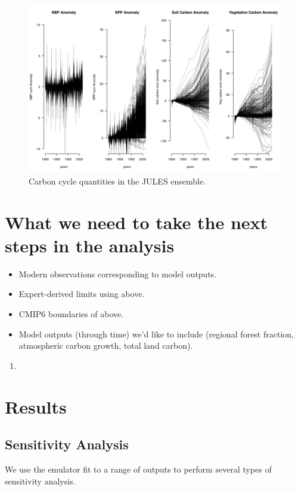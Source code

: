 \documentclass[gmd, manuscript]{copernicus}
\begin{document}
%
\begin{figure}[t]
\includegraphics[width=12cm]{./graphics/plot-carbon-cycle-anomaly-timeseries-1}
\caption{Carbon cycle quantities in the JULES ensemble.}
\end{figure}





\section{What we need to take the next steps in the analysis}

\begin{itemize}
    \item Modern observations corresponding to model outputs.
    \item Expert-derived limits using above.
    \item CMIP6 boundaries of above.
    \item Model outputs (through time) we'd like to include (regional forest fraction, atmospheric carbon growth, total land carbon).
\end{itemize}

\begin{enumerate}
    \item 
\end{enumerate}



\section{Results}



\subsection{Sensitivity Analysis}
We use the emulator fit to a range of outputs to perform several types of sensitivity analysis.
\end{document}
